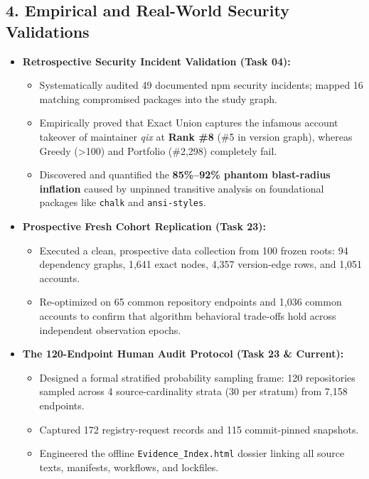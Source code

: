 \documentclass[11pt,a4paper]{article}
\begin{document}
\subsection{4. Empirical and Real-World Security Validations}
\begin{itemize}
  \item \textbf{Retrospective Security Incident Validation (Task 04):}
  \begin{itemize}
    \item Systematically audited 49 documented npm security incidents; mapped 16 matching compromised packages into the study graph.
    \item Empirically proved that Exact Union captures the infamous account takeover of maintainer \textit{qix} at \textbf{Rank \#8} (\#5 in version graph), whereas Greedy (>100) and Portfolio (\#2,298) completely fail.
    \item Discovered and quantified the \textbf{85\%--92\% phantom blast-radius inflation} caused by unpinned transitive analysis on foundational packages like \nolinkurl{chalk} and \nolinkurl{ansi-styles}.
  \end{itemize}
  \item \textbf{Prospective Fresh Cohort Replication (Task 23):}
  \begin{itemize}
    \item Executed a clean, prospective data collection from 100 frozen roots: 94 dependency graphs, 1,641 exact nodes, 4,357 version-edge rows, and 1,051 accounts.
    \item Re-optimized on 65 common repository endpoints and 1,036 common accounts to confirm that algorithm behavioral trade-offs hold across independent observation epochs.
  \end{itemize}
  \item \textbf{The 120-Endpoint Human Audit Protocol (Task 23 \& Current):}
  \begin{itemize}
    \item Designed a formal stratified probability sampling frame: 120 repositories sampled across 4 source-cardinality strata (30 per stratum) from 7,158 endpoints.
    \item Captured 172 registry-request records and 115 commit-pinned snapshots.
    \item Engineered the offline \nolinkurl{Evidence_Index.html} dossier linking all source texts, manifests, workflows, and lockfiles.
  \end{itemize}
\end{itemize}
\end{document}
